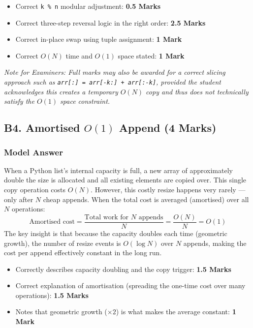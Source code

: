 \documentclass[11pt,a4paper]{article}
\newenvironment{markbox}[1]{%
    \begin{tcolorbox}[colback=markgreen!6!white, colframe=markgreen, title=\textbf{Mark Allocation --- #1}]
}{%
    \end{tcolorbox}
}
\begin{document}
\begin{markbox}{B3 --- 5 Marks}
\begin{itemize}
    \item Correct \texttt{k \% n} modular adjustment: \textbf{0.5 Marks}
    \item Correct three-step reversal logic in the right order: \textbf{2.5 Marks}
    \item Correct in-place swap using tuple assignment: \textbf{1 Mark}
    \item Correct $O(N)$ time and $O(1)$ space stated: \textbf{1 Mark}
\end{itemize}
\textit{Note for Examiners: Full marks may also be awarded for a correct slicing approach such as \texttt{arr[:] = arr[-k:] + arr[:-k]}, provided the student acknowledges this creates a temporary $O(N)$ copy and thus does not technically satisfy the $O(1)$ space constraint.}
\end{markbox}

\subsection*{B4. Amortised $O(1)$ Append (4 Marks)}

\subsubsection*{Model Answer}
When a Python list's internal capacity is full, a new array of approximately double the size is allocated and all existing elements are copied over. This single copy operation costs $O(N)$. However, this costly resize happens very rarely --- only after $N$ cheap appends. When the total cost is averaged (amortised) over all $N$ operations:
\[
\text{Amortised cost} = \frac{\text{Total work for } N \text{ appends}}{N} = \frac{O(N)}{N} = O(1)
\]
The key insight is that because the capacity doubles each time (geometric growth), the number of resize events is $O(\log N)$ over $N$ appends, making the cost per append effectively constant in the long run.

\begin{markbox}{B4 --- 4 Marks}
\begin{itemize}
    \item Correctly describes capacity doubling and the copy trigger: \textbf{1.5 Marks}
    \item Correct explanation of amortisation (spreading the one-time cost over many operations): \textbf{1.5 Marks}
    \item Notes that geometric growth ($\times 2$) is what makes the average constant: \textbf{1 Mark}
\end{itemize}
\end{markbox}
\end{document}
